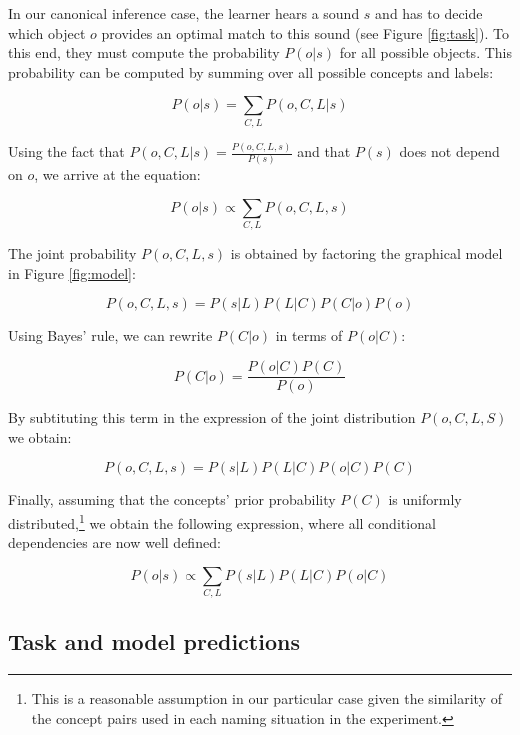 \documentclass[english,,man]{apa6}
\let\rmarkdownfootnote\footnote%
\def\footnote{\protect\rmarkdownfootnote}
\begin{document}
In our canonical inference case, the learner hears a sound \(s\) and has to decide which object \(o\) provides an optimal match to this sound (see Figure \ref{fig:task}). To this end, they must compute the probability \(P(o|s)\) for all possible objects. This probability can be computed by summing over all possible concepts and labels:

\begin{equation}
P(o|s)=\sum_{C,L} P(o, C, L| s)  
\end{equation}

Using the fact that \(P(o,C,L|s) = \frac{P(o,C,L,s)}{P(s)}\) and that \(P(s)\) does not depend on \(o\), we arrive at the equation:

\begin{equation}
P(o|s) \propto \sum_{C,L} P(o, C, L, s) 
\end{equation}

The joint probability \(P(o,C,L,s)\) is obtained by factoring the graphical model in Figure \ref{fig:model}:

\[P(o,C,L,s) = P(s|L)P(L|C)P(C|o)P(o)\]

Using Bayes' rule, we can rewrite \(P(C|o)\) in terms of \(P(o|C)\):

\[P(C|o) = \frac{P(o|C)P(C)}{P(o)}\]

By subtituting this term in the expression of the joint distribution \(P(o,C,L,S)\) we obtain:

\[P(o,C,L,s) = P(s|L)P(L|C)P(o|C)P(C)\]

Finally, assuming that the concepts' prior probability \(P(C)\) is uniformly distributed,\footnote{This is a reasonable assumption in our particular case given the similarity of the concept pairs used in each naming situation in the experiment.} we obtain the following expression, where all conditional dependencies are now well defined:

\begin{equation} \label{eq:general}
P(o|s) \propto \sum_{C,L}  P(s|L)P(L|C)P(o|C)
\end{equation}

\hypertarget{task-and-model-predictions}{%
\subsection{Task and model predictions}\label{task-and-model-predictions}}
\end{document}
